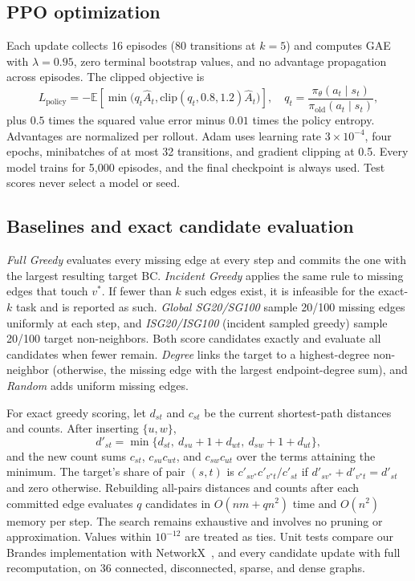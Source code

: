 \documentclass[runningheads]{llncs}
\begin{document}
\subsection{PPO optimization}
Each update collects 16 episodes (80 transitions at $k=5$) and computes GAE
with $\lambda=0.95$, zero terminal bootstrap values, and no advantage
propagation across episodes. The clipped objective is
\begin{equation}
 L_{\mathrm{policy}}=-\mathbb{E}\left[
 \min\bigl(q_t\hat A_t,\mathrm{clip}(q_t,0.8,1.2)\hat A_t\bigr)\right],
 \quad q_t=\frac{\pi_\theta(a_t\mid s_t)}{\pi_{\mathrm{old}}(a_t\mid s_t)},
\end{equation}
plus $0.5$ times the squared value error minus $0.01$ times the policy
entropy. Advantages are normalized per rollout. Adam uses learning rate
$3\times10^{-4}$, four epochs, minibatches of at most 32 transitions, and
gradient clipping at 0.5. Every model trains for 5,000 episodes, and the
final checkpoint is always used. Test scores never select a model or seed.

\subsection{Baselines and exact candidate evaluation}
\emph{Full Greedy} evaluates every missing edge at every step and commits
the one with the largest resulting target BC. \emph{Incident Greedy} applies
the same rule to missing edges that touch $v^*$. If fewer than $k$ such
edges exist, it is infeasible for the exact-$k$ task and is reported as such.
\emph{Global SG20/SG100} sample 20/100 missing edges uniformly at each step,
and \emph{ISG20/ISG100} (incident sampled greedy) sample 20/100 target
non-neighbors. Both score candidates exactly and evaluate all candidates
when fewer remain. \emph{Degree} links the target to a highest-degree
non-neighbor (otherwise, the missing edge with the largest endpoint-degree
sum), and \emph{Random} adds uniform missing edges.

For exact greedy scoring, let $d_{st}$ and $c_{st}$ be the current
shortest-path distances and counts. After inserting $\{u,w\}$,
\begin{equation}
 d'_{st}=\min\{d_{st},\ d_{su}+1+d_{wt},\ d_{sw}+1+d_{ut}\},
 \label{eq:update}
\end{equation}
and the new count sums $c_{st}$, $c_{su}c_{wt}$, and $c_{sw}c_{ut}$ over the
terms attaining the minimum. The target's share of pair $(s,t)$ is
$c'_{sv^*}c'_{v^*t}/c'_{st}$ if $d'_{sv^*}+d'_{v^*t}=d'_{st}$ and zero
otherwise. Rebuilding all-pairs distances and counts after each committed
edge evaluates $q$ candidates in $O(nm+qn^2)$ time and $O(n^2)$ memory per
step. The search remains exhaustive and involves no pruning or
approximation. Values within $10^{-12}$ are treated as ties. Unit tests compare our Brandes implementation with
NetworkX~\cite{Hagberg2008}, and every candidate update with full
recomputation, on 36 connected, disconnected, sparse, and dense graphs.
\end{document}
